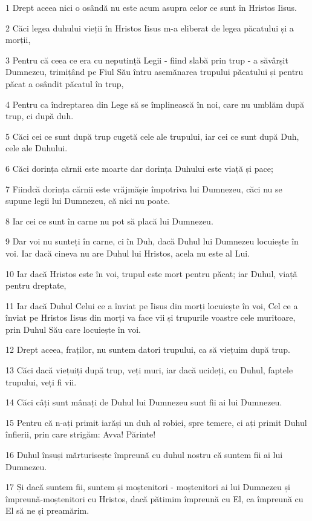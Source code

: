 \par 1 Drept aceea nici o osândă nu este acum asupra celor ce sunt în Hristos Iisus.
\par 2 Căci legea duhului vieții în Hristos Iisus m-a eliberat de legea păcatului și a morții,
\par 3 Pentru că ceea ce era cu neputință Legii - fiind slabă prin trup - a săvârșit Dumnezeu, trimițând pe Fiul Său întru asemănarea trupului păcatului și pentru păcat a osândit păcatul în trup,
\par 4 Pentru ca îndreptarea din Lege să se împlinească în noi, care nu umblăm după trup, ci după duh.
\par 5 Căci cei ce sunt după trup cugetă cele ale trupului, iar cei ce sunt după Duh, cele ale Duhului.
\par 6 Căci dorința cărnii este moarte dar dorința Duhului este viață și pace;
\par 7 Fiindcă dorința cărnii este vrăjmășie împotriva lui Dumnezeu, căci nu se supune legii lui Dumnezeu, că nici nu poate.
\par 8 Iar cei ce sunt în carne nu pot să placă lui Dumnezeu.
\par 9 Dar voi nu sunteți în carne, ci în Duh, dacă Duhul lui Dumnezeu locuiește în voi. Iar dacă cineva nu are Duhul lui Hristos, acela nu este al Lui.
\par 10 Iar dacă Hristos este în voi, trupul este mort pentru păcat; iar Duhul, viață pentru dreptate,
\par 11 Iar dacă Duhul Celui ce a înviat pe Iisus din morți locuiește în voi, Cel ce a înviat pe Hristos Iisus din morți va face vii și trupurile voastre cele muritoare, prin Duhul Său care locuiește în voi.
\par 12 Drept aceea, fraților, nu suntem datori trupului, ca să viețuim după trup.
\par 13 Căci dacă viețuiți după trup, veți muri, iar dacă ucideți, cu Duhul, faptele trupului, veți fi vii.
\par 14 Căci câți sunt mânați de Duhul lui Dumnezeu sunt fii ai lui Dumnezeu.
\par 15 Pentru că n-ați primit iarăși un duh al robiei, spre temere, ci ați primit Duhul înfierii, prin care strigăm: Avva! Părinte!
\par 16 Duhul însuși mărturisește împreună cu duhul nostru că suntem fii ai lui Dumnezeu.
\par 17 Și dacă suntem fii, suntem și moștenitori - moștenitori ai lui Dumnezeu și împreună-moștenitori cu Hristos, dacă pătimim împreună cu El, ca împreună cu El să ne și preamărim.
